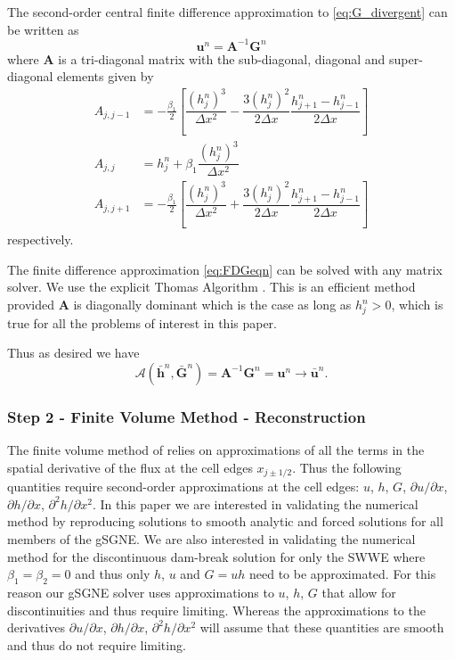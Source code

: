 \documentclass[10pt]{elsarticle}
\newcommand{\vecn}[1]{\boldsymbol{#1}}
\begin{document}
The second-order central finite difference approximation to \eqref{eq:G_divergent} can be written as
\begin{equation}
{\vecn{u}}^n = \vecn{A}^{-1} {\vecn{G}}^n
\label{eq:FDGeqn}
\end{equation}
where $\vecn{A}$ is a tri-diagonal matrix with the sub-diagonal, diagonal and super-diagonal elements given by
\begin{subequations}
\begin{align}
A_{j,j-1} &=  -\frac{\beta_1}{2}  \left[  \dfrac{\left(h_j^n\right)^3}{\Delta x^2} -  \dfrac{3\left(h_j^n\right)^2}{2\Delta x} \dfrac{h_{j+1}^n - h_{j-1}^n}{2\Delta x}\right] \\
A_{j,j} &= h^n_j + \beta_1\dfrac{\left(h_j^n\right)^3}{\Delta x^2} \\
A_{j,j+1} &=  -\frac{\beta_1}{2}  \left[  \dfrac{\left(h_j^n\right)^3}{\Delta x^2} +  \dfrac{3\left(h_j^n\right)^2}{2\Delta x} \dfrac{h_{j+1}^n - h_{j-1}^n}{2\Delta x}\right]
\end{align}
\label{eq:Adiags}
\end{subequations}
respectively. 

The finite difference approximation \eqref{eq:FDGeqn} can be solved with any matrix solver. We use the explicit Thomas Algorithm \cite{Conte-DeBoor-1980}. This is an efficient method provided $\vecn{A}$ is diagonally dominant which is the case as long as $h_{j}^n > 0$, which is true for all the problems of interest in this paper. 


Thus as desired we have 
\begin{equation}
\mathcal{A}\left(\bar{\vecn{h}}^n,\bar{\vecn{G}}^n\right) = \vecn{A}^{-1} {\vecn{G}}^n = \vecn{u}^n \boldsymbol{\rightarrow} \bar{{\vecn{u}}}^n. 
\label{eq:A_secondord}
\end{equation}


\subsubsection{Step 2 -  Finite Volume Method  - Reconstruction}
The finite volume method of \citet{Kurganov-etal-2001-707} relies on approximations of all the terms in the spatial derivative of the flux at the cell edges $x_{j\pm1/2}$. Thus the following quantities require second-order approximations at the cell edges: $u$, $h$, $G$, $\partial u / \partial x$, $\partial h / \partial x$, $\partial^2 h / \partial x^2$. In this paper we are interested in validating the numerical method by reproducing solutions to smooth analytic and forced solutions for all members of the gSGNE. We are also interested in validating the numerical method for the discontinuous dam-break solution for only the SWWE where $\beta_1 = \beta_2 = 0$ and thus only $h$, $u$ and $G = uh$ need to be approximated. For this reason our gSGNE solver uses approximations to  $u$, $h$, $G$ that allow for discontinuities and thus require limiting. Whereas the approximations to the derivatives $\partial u / \partial x$, $\partial h / \partial x$, $\partial^2 h / \partial x^2$ will assume that these quantities are smooth and thus do not require limiting. 
\end{document}
